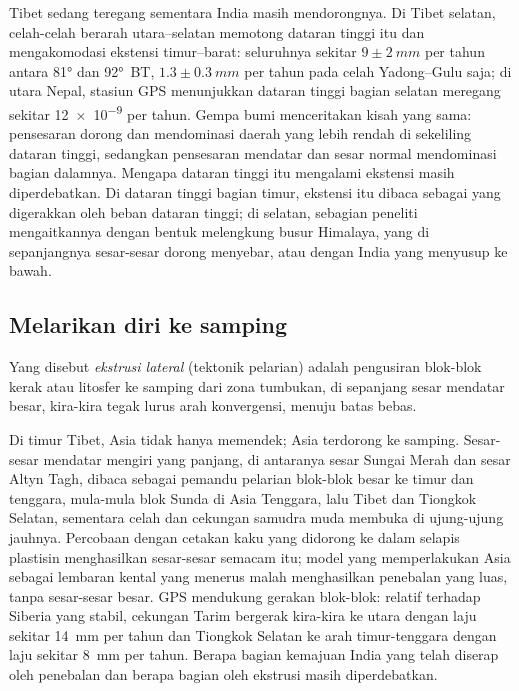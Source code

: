 Tibet sedang teregang sementara India masih mendorongnya. Di Tibet selatan, celah-celah berarah utara--selatan
memotong dataran tinggi itu dan mengakomodasi ekstensi timur--barat: seluruhnya sekitar $9 \pm \qty{2}{mm}$ per tahun
antara \ang{81} dan \ang{92}~BT, $1.3 \pm \qty{0.3}{mm}$ per tahun pada celah Yadong--Gulu
saja; di utara Nepal, stasiun GPS menunjukkan dataran tinggi bagian selatan meregang sekitar
\num{12e-9} per tahun. Gempa bumi menceritakan kisah yang sama: pensesaran dorong dan 
mendominasi daerah yang lebih rendah di sekeliling dataran tinggi, sedangkan pensesaran mendatar dan sesar normal mendominasi bagian dalamnya.
Mengapa dataran tinggi itu mengalami ekstensi masih diperdebatkan. Di dataran tinggi bagian timur, ekstensi itu dibaca sebagai  yang digerakkan oleh beban dataran tinggi; di selatan, sebagian peneliti mengaitkannya dengan bentuk melengkung
busur Himalaya, yang di sepanjangnya sesar-sesar dorong menyebar, atau dengan India yang menyusup ke bawah.

\subsection{Melarikan diri ke samping}

\begin{definition}\label{def:b2:himalaya-andes:extrusion}
Yang disebut \emph{ekstrusi lateral} (tektonik pelarian) adalah pengusiran
blok-blok kerak atau litosfer ke samping dari zona tumbukan, di sepanjang sesar mendatar besar,
kira-kira tegak lurus arah konvergensi, menuju batas bebas.
\end{definition}

Di timur Tibet, Asia tidak hanya memendek; Asia terdorong ke samping. Sesar-sesar mendatar mengiri
yang panjang, di antaranya sesar Sungai Merah dan sesar Altyn Tagh, dibaca sebagai pemandu
pelarian blok-blok besar ke timur dan tenggara, mula-mula blok Sunda di Asia Tenggara,
lalu Tibet dan Tiongkok Selatan, sementara celah dan cekungan samudra muda membuka di ujung-ujung jauhnya.
Percobaan dengan cetakan kaku yang didorong ke dalam selapis plastisin menghasilkan sesar-sesar semacam itu; model
yang memperlakukan Asia sebagai lembaran kental yang menerus malah menghasilkan penebalan yang luas, tanpa
sesar-sesar besar. GPS mendukung gerakan blok-blok: relatif terhadap Siberia yang stabil, cekungan
Tarim bergerak kira-kira ke utara dengan laju sekitar \qty{14}{mm} per tahun dan Tiongkok Selatan ke arah timur-tenggara
dengan laju sekitar \qty{8}{mm} per tahun. Berapa bagian kemajuan India yang telah diserap oleh penebalan dan berapa
bagian oleh ekstrusi masih diperdebatkan.

